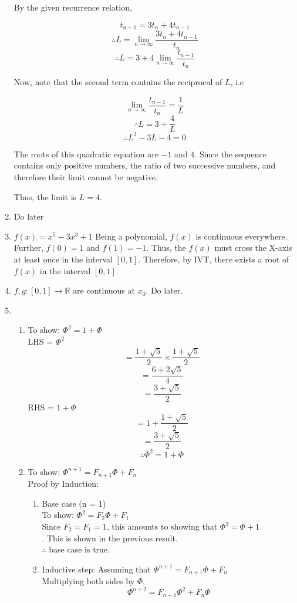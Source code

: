 \documentclass[a4paper,12pt]{article} %
\begin{document}
\begin{enumerate}
    By the given recurrence relation,

    $$ t_{n+1} = 3t_n + 4t_{n - 1} $$
    $$ \therefore L = \lim_{n \to \infty}\frac{3t_n + 4t_{n - 1}}{t_n}$$
    $$ \therefore L = 3 + 4\lim_{n \to \infty}\frac{t_{n - 1}}{t_n}$$

    Now, note that the second term contains the reciprocal of $L$, i.e

    $$ \lim_{n \to \infty}\frac{t_{n - 1}}{t_n} = \frac{1}{L}$$
    $$ \therefore L = 3 + \frac{4}{L}$$
    $$ \therefore L^2 - 3L - 4 = 0$$

    The roots of this quadratic equation are $-1$ and $4$. Since the sequence contains only positive numbers, the ratio of two successive numbers, and therefore their limit cannot be negative.

    Thus, the limit is $L = 4$.

  \item Do later
  \item $f(x) = x^5 - 3x^3 + 1$
    Being a polynomial, $f(x)$ is continuous everywhere. Further, $f(0) = 1$ and $f(1) = -1$.
    Thus, the $f(x)$ must cross the X-axis at least once in the interval $[0, 1]$.
    Therefore, by IVT, there exists a root of $f(x)$ in the interval $[0, 1]$.
  \item $f, g: [0, 1] \rightarrow \mathbb{R}$ are continuous at $x_0$. Do later.
  \item
    \begin{enumerate}
      \item To show: $\Phi^2 = 1 + \Phi$\\
        LHS = $\Phi^2$
        $$ = \frac{1 + \sqrt{5}}{2} \times \frac{1 + \sqrt{5}}{2} $$
        $$ = \frac{6 + 2\sqrt{5}}{4} $$
        $$ = \frac{3 + \sqrt{5}}{2} $$
        RHS = $1 + \Phi$\\
        $$ = 1 + \frac{1 + \sqrt{5}}{2} $$
        $$ = \frac{3 + \sqrt{5}}{2} $$
        $$ \therefore \Phi^2 = 1 + \Phi$$
      \item To show: $\Phi^{n+1} = F_{n+1}\Phi + F_{n}$\\
        Proof by Induction:\\
        \begin{enumerate}
          \item Base case (n = 1)\\
            To show: $\Phi^{2} = F_{2}\Phi + F_{1}$\\
            Since $F_2 = F_1 = 1$, this amounts to showing that $\Phi^2 = \Phi + 1$\\.
            This is shown in the previous result.\\
            $\therefore$ base case is true.
          \item Inductive step: Assuming that $\Phi^{n+1} = F_{n+1}\Phi + F_{n}$\\
            Multiplying both sides by $\Phi$,\\
            $$\Phi^{n+2} = F_{n+1}\Phi^2 + F_{n}\Phi$$


\end{enumerate}
\end{enumerate}
\end{enumerate}
\end{document}
